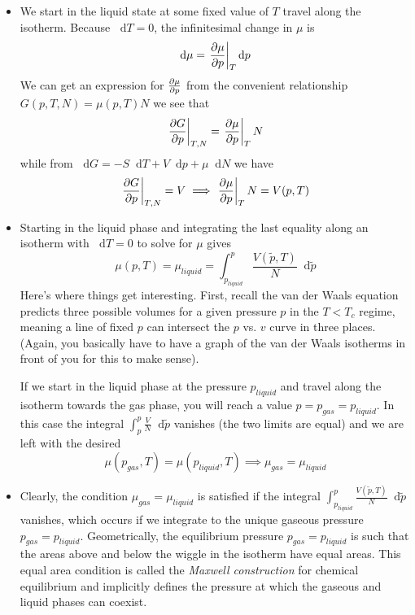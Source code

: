 \documentclass[11pt, a4paper]{article}
\newcommand{\diff}{\mathop{}\!\mathrm{d}} %
\begin{document}
\begin{itemize}
	\item We start in the liquid state at some fixed value of $ T $ travel along the isotherm. Because $ \diff T = 0 $, the infinitesimal change in $ \mu $ is 
	\begin{equation*}
		\diff \mu = \eval{\pdv{\mu}{p}}_{T} \diff p
	\end{equation*}
	We can get an expression for $ \pdv{\mu}{p} $ from the convenient relationship $ G(p, T, N) = \mu(p, T)N $ we see that
	\begin{equation*}
		\eval{\pdv{G}{p}}_{T, N} = \eval{\pdv{\mu}{p}}_{T} N
	\end{equation*}
	while from $ \diff G = -S \diff T + V \diff p + \mu \diff N $ we have
	\begin{equation*}
		\eval{\pdv{G}{p}}_{T, N} = V \implies \eval{\pdv{\mu}{p}}_{T} N = V(p, T)
	\end{equation*}
	
	\item Starting in the liquid phase and integrating the last equality along an isotherm with $ \diff T = 0 $ to solve for $ \mu $ gives
	\begin{equation*}
		\mu(p, T) = \mu_{liquid} = \int_{p_{liquid}}^{p} \frac{V(\tilde{p}, T)}{N} \diff \tilde{p}
	\end{equation*}
	Here's where things get interesting. First, recall the van der Waals equation predicts three possible volumes for a given pressure $ p $ in the $ T < T_{c} $ regime, meaning a line of fixed $ p $ can intersect the $ p $ vs. $ v $ curve in three places. (Again, you basically have to have a graph of the van der Waals isotherms in front of you for this to make sense).
	
	If we start in the liquid phase at the pressure $ p_{liquid} $ and travel along the isotherm towards the gas phase, you will reach a value $ p = p_{gas} = p_{liquid} $. In this case the integral $ \int_{p}^{p} \frac{V}{N} \diff \tilde{p} $ vanishes (the two limits are equal) and we are left with the desired 
	\begin{equation*}
		\mu(p_{gas}, T) = \mu(p_{liquid}, T) \implies \mu_{gas} = \mu_{liquid}
	\end{equation*}
	
	\item Clearly, the condition $ \mu_{gas} = \mu_{liquid} $ is satisfied if the integral $ \int_{p_{liquid}}^{p} \frac{V(\tilde{p}, T)}{N} \diff \tilde{p} $ vanishes, which occurs if we integrate to the unique gaseous pressure $ p_{gas} = p_{liquid} $. Geometrically, the equilibrium pressure $ p_{gas} = p_{liquid} $ is such that the areas above and below the wiggle in the isotherm have equal areas.  This equal area condition is called the \textit{Maxwell construction} for chemical equilibrium and implicitly defines the pressure at which the gaseous and liquid phases can coexist.
	

\end{itemize}
\end{document}
